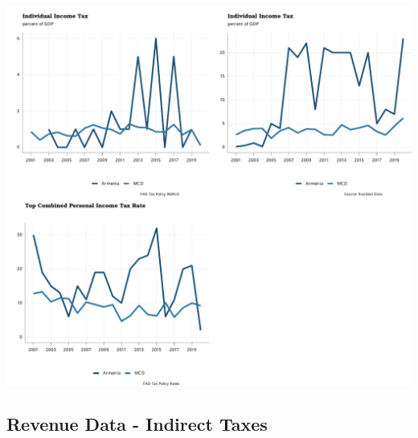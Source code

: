 \documentclass[
]{article}
\begin{document}
\begin{center}\includegraphics{RandomData_MCD__files/figure-latex/weoDirectTaxesIndividual-1} \end{center}

\newpage

\hypertarget{revenue-data---indirect-taxes}{%
\subsection{Revenue Data - Indirect
Taxes}\label{revenue-data---indirect-taxes}}
\end{document}
